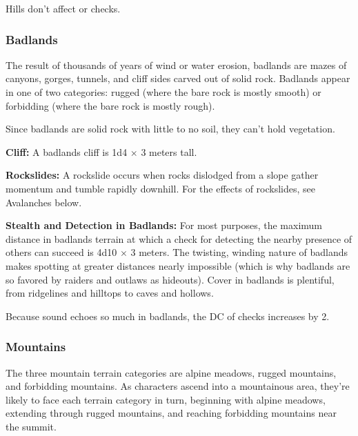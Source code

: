 Hills don't affect  or  checks.

\subsubsection{Badlands}
The result of thousands of years of wind or water erosion, badlands are mazes of canyons, gorges, tunnels, and cliff sides carved out of solid rock. Badlands appear in one of two categories: rugged (where the bare rock is mostly smooth) or forbidding (where the bare rock is mostly rough).

Since badlands are solid rock with little to no soil, they can't hold vegetation.


\textbf{Cliff:} A badlands cliff is 1d4 $\times$ 3 meters tall.

\textbf{Rockslides:} A rockslide occurs when rocks dislodged from a slope gather momentum and tumble rapidly downhill. For the effects of rockslides, see Avalanches below.

\textbf{Stealth and Detection in Badlands:} For most purposes, the maximum distance in badlands terrain at which a  check for detecting the nearby presence of others can succeed is 4d10 $\times$ 3 meters. The twisting, winding nature of badlands makes spotting at greater distances nearly impossible (which is why badlands are so favored by raiders and outlaws as hideouts). Cover in badlands is plentiful, from ridgelines and hilltops to caves and hollows.

Because sound echoes so much in badlands, the DC of  checks increases by 2.

\subsubsection{Mountains}
The three mountain terrain categories are alpine meadows, rugged mountains, and forbidding mountains. As characters ascend into a mountainous area, they're likely to face each terrain category in turn, beginning with alpine meadows, extending through rugged mountains, and reaching forbidding mountains near the summit.

